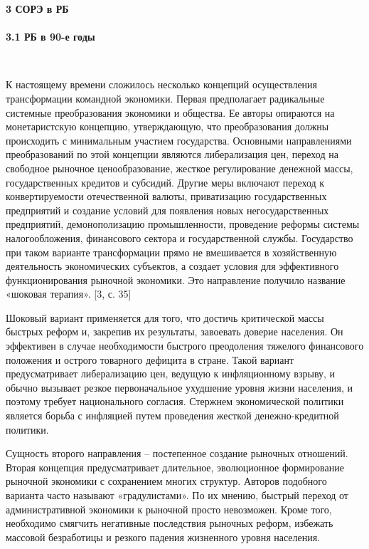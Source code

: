 \documentclass[14pt,a4paper]{article}
\begin{document}
    \newpage
    \begin{center}
        \textbf{3 СОРЭ в РБ}
        \\
        \HRule\\[0.5cm]
        \textbf{3.1 РБ в 90-е годы}
    \end{center}
    \\
    \par
    К настоящему времени сложилось несколько концепций осуществления трансформации командной экономики.
    Первая предполагает радикальные системные преобразования экономики и общества.
    Ее авторы опираются на монетаристскую концепцию, утверждающую, что преобразования должны происходить с минимальным участием государства.
    Основными направлениями преобразований по этой концепции являются либерализация цен, переход на свободное рыночное ценообразование, жесткое регулирование денежной массы, государственных кредитов и субсидий.
    Другие меры включают переход к конвертируемости отечественной валюты, приватизацию государственных предприятий и создание условий для появления новых негосударственных предприятий, демонополизацию промышленности, проведение реформы системы налогообложения, финансового сектора и государственной службы.
    Государство при таком варианте трансформации прямо не вмешивается в хозяйственную деятельность экономических субъектов, а создает условия для эффективного функционирования рыночной экономики.
    Это направление получило название «шоковая терапия». [3, с. 35]
    \par
    Шоковый вариант применяется для того, что достичь критической массы быстрых реформ и, закрепив их результаты, завоевать доверие населения.
    Он эффективен в случае необходимости быстрого преодоления тяжелого финансового положения и острого товарного дефицита в стране.
    Такой вариант предусматривает либерализацию цен, ведущую к инфляционному взрыву, и обычно вызывает резкое первоначальное ухудшение уровня жизни населения, и поэтому требует национального согласия.
    Стержнем экономической политики является борьба с инфляцией путем проведения жесткой денежно-кредитной политики.
    \par
    Сущность второго направления – постепенное создание рыночных отношений.
    Вторая концепция предусматривает длительное, эволюционное формирование рыночной экономики с сохранением многих структур.
    Авторов подобного варианта часто называют «градулистами».
    По их мнению, быстрый переход от административной экономики к рыночной просто невозможен.
    Кроме того, необходимо смягчить негативные последствия рыночных реформ, избежать массовой безработицы и резкого падения жизненного уровня населения.
\end{document}
